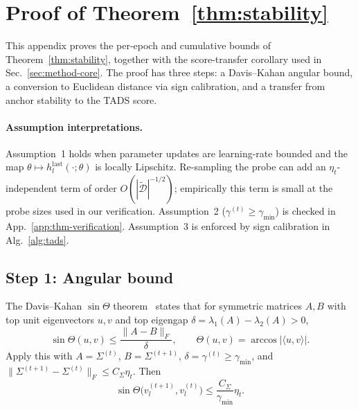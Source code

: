 \appendix

\section{Proof of Theorem~\ref{thm:stability}}
\label{app:proof-stability}

This appendix proves the per-epoch and cumulative bounds of
Theorem~\ref{thm:stability}, together with the score-transfer
corollary used in Sec.~\ref{sec:method-core}. The proof has three
steps: a Davis--Kahan angular bound, a conversion to Euclidean
distance via sign calibration, and a transfer from anchor stability
to the \textsc{TADS} score.

\paragraph{Assumption interpretations.}
Assumption~1 holds when parameter updates are learning-rate bounded
and the map $\theta \mapsto h_l^{\mathrm{last}}(\cdot;\theta)$ is
locally Lipschitz. Re-sampling the probe can add an
$\eta_t$-independent term of order
$O(|\widetilde{\mathcal{D}}|^{-1/2})$; empirically this term is small
at the probe sizes used in our verification. Assumption~2
($\gamma^{(t)}\ge\gamma_{\min}$) is checked in
App.~\ref{app:thm-verification}. Assumption~3 is enforced by sign
calibration in Alg.~\ref{alg:tads}.

\subsection{Step 1: Angular bound}
\label{app:step-angular}

The Davis--Kahan $\sin\Theta$ theorem~\cite{daviskahan} states that
for symmetric matrices $A,B$ with top unit eigenvectors $u,v$ and
top eigengap $\delta=\lambda_1(A)-\lambda_2(A)>0$,
\[
\sin\Theta(u,v)\le \frac{\|A-B\|_F}{\delta},
\qquad
\Theta(u,v)=\arccos|\langle u,v\rangle|.
\]
Apply this with $A=\Sigma^{(t)}$, $B=\Sigma^{(t+1)}$,
$\delta=\gamma^{(t)}\ge\gamma_{\min}$, and
$\|\Sigma^{(t+1)}-\Sigma^{(t)}\|_F\le C_\Sigma\eta_t$. Then
\begin{equation}
  \sin\Theta\bigl(v_l^{(t+1)},v_l^{(t)}\bigr)
  \le
  \frac{C_\Sigma}{\gamma_{\min}}\eta_t .
  \label{eq:angular-bound}
\end{equation}

